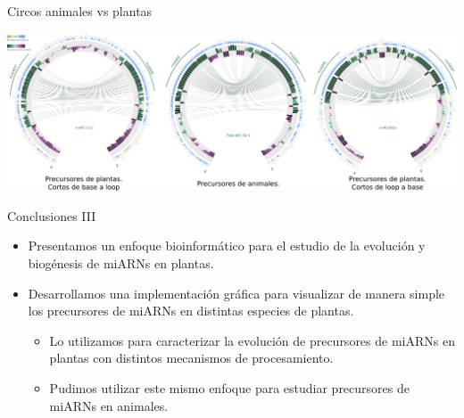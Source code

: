 \documentclass{beamer}
\begin{document}

\begin{frame}{Circos animales vs plantas}
	\begin{center}
		\includegraphics[width=1\textwidth]{img/animals_vs_plants_circos_defensa.png}
	\end{center}
\end{frame}


\begin{frame}{Conclusiones III}
	\begin{itemize}
        \item<1-> Presentamos un enfoque bioinformático para el estudio de la evolución y biogénesis de miARNs en plantas.
        \item<2-> Desarrollamos una implementación gráfica para visualizar de manera simple los precursores de miARNs en distintas especies de plantas.
        
        	\begin{itemize}
			\item<3-> Lo utilizamos para caracterizar la evolución de precursores de miARNs en plantas con distintos mecanismos de procesamiento.
			\item<4-> Pudimos utilizar este mismo enfoque para estudiar precursores de miARNs en animales.
		\end{itemize}
	\end{itemize}
\end{frame}
\end{document}
